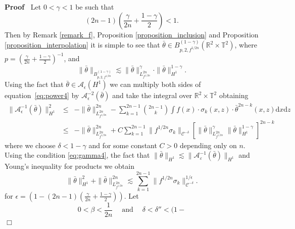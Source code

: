 \documentclass[a4paper,10pt]{article}
\newcommand{\mathd}{\mathrm{d}}
\newcommand{\tmop}[1]{\ensuremath{\operatorname{#1}}}
\newenvironment{proof}{\noindent\textbf{Proof\ }}{\hspace*{\fill}$\Box$\medskip}
\begin{document}
\begin{proof}
  Let $0 < \gamma < 1$ be such that
  \begin{equation}
    (2 n - 1) \left( \frac{\gamma}{2 n} + \frac{1 - \gamma}{2} \right) < 1.
    \label{eq:gamma4}
  \end{equation}
  Then by Remark \ref{remark_f}, Proposition \ref{proposition_inclusion} and
  Proposition \ref{proposition_interpolation} it is simple to see that
  $\bar{\theta} \in B^{(1 - \gamma)}_{p, 2, f^{1 / 2 n}} (\mathbb{R}^2 \times
  \mathbb{T}^2)$, where $p = \left( \frac{\gamma}{2 n} + \frac{1 - \gamma}{2}
  \right)^{- 1}$, and
  \[ \| \bar{\theta} \|_{B^{(1 - \gamma)}_{p, 2, f^{1 / 2 n}}} \lesssim \|
     \bar{\theta} \|_{L^{2 n}_{f^{1 / 2 n}}}^{\gamma} \cdot \| \bar{\theta}
     \|^{1 - \gamma}_{H^1} . \]
  Using the fact that $\bar{\theta} \in \mathcal{A}_{\epsilon} (H^1)$ we can
  multiply both sides of equation~{\eqref{eq:power4}} by
  $\mathcal{A}_{\epsilon}^{- 2} (\bar{\theta})$ and take the integral over
  $\mathbb{R}^2 \times \mathbb{T}^2$ obtaining
  \begin{eqnarray}
    \| \mathcal{A}_{\epsilon}^{- 1} (\bar{\theta}) \|_{H^1}^2 & \leqslant & -
    \| \bar{\theta} \|_{L^{2 n}_{f^{1 / 2 n}}}^{2 n} - \sum_{k = 1}^{2 n - 1}
    \binom{2 n - 1}{k} \int f (x) \cdot \sigma_k (x, z) \cdot \bar{\theta}^{2
    n - k} (x, z) \mathd x \mathd z \nonumber\\
    & \leqslant & - \| \bar{\theta} \|_{L^{2 n}_{f^{1 / 2 n}}}^{2 n} + C
    \sum_{k = 1}^{2 n - 1} \| f^{1 / 2 n} \sigma_k \|_{\mathcal{C}^{- \delta}}
    \left[ \| \bar{\theta} \|_{L^{2 n}_{f^{1 / 2 n}}}^{\gamma} \| \bar{\theta}
    \|^{1 - \gamma}_{H^1} \right]^{2 n - k} \nonumber
  \end{eqnarray}
  where we choose $\delta < 1 - \gamma$ and for some constant $C > 0$
  depending only on $n$. Using the condition {\eqref{eq:gamma4}}, the fact
  that $\| \bar{\theta} \|_{H^1} \lesssim \| \mathcal{A}^{- 1}_{\varepsilon}
  (\bar{\theta}) \|_{H^1}$ and Young's inequality for products we obtain
  \begin{equation}
    \| \bar{\theta} \|_{H^1}^2 + \| \bar{\theta} \|_{L^{2 n}_{f^{1
    / 2 n}}}^{2 n} \lesssim \sum_{k = 1}^{2 n - 1} \| f^{1 / 2 n} \sigma_k
    \|_{\mathcal{C}^{- \delta}}^{1 / \epsilon} . \label{eq:p1}
  \end{equation}
  for $\epsilon = \left( 1 - (2 n - 1) \left( \frac{\gamma}{2 n} + \frac{1 -
  \gamma}{2} \right) \right)$. Let
  \begin{equation}
    0 < \beta < \frac{1}{2 n} \quad \tmop{and} \quad \delta < \delta'' < (1 -

\end{equation}
\end{proof}
\end{document}
